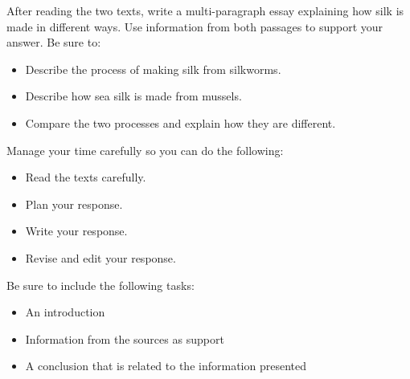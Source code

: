 \documentclass[12pt]{article}
\begin{document}
\begin{spacing}{1.15}
    After reading the two texts, write a multi-paragraph essay explaining how silk is made in different ways. Use information from both passages to support your answer. Be sure to:
    \begin{itemize}
        \item Describe the process of making silk from silkworms.
        \item Describe how sea silk is made from mussels.
        \item Compare the two processes and explain how they are different.
    \end{itemize}

    Manage your time carefully so you can do the following:
    \begin{itemize}
        \item Read the texts carefully.
        \item Plan your response.
        \item Write your response.
        \item Revise and edit your response.
    \end{itemize}

    Be sure to include the following tasks:
    \begin{itemize}
        \item An introduction
        \item Information from the sources as support
        \item A conclusion that is related to the information presented
    \end{itemize}
\end{spacing}
\end{document}
